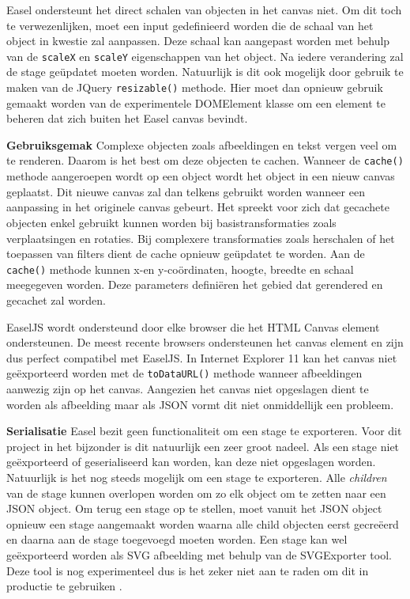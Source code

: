 Easel ondersteunt het direct schalen van objecten in het canvas niet. Om dit toch te verwezenlijken, moet een input gedefinieerd worden die de schaal van het object in kwestie zal aanpassen. Deze schaal kan aangepast worden met behulp van de \texttt{scaleX} en \texttt{scaleY} eigenschappen van het object. Na iedere verandering zal de stage ge\"{u}pdatet moeten worden. Natuurlijk is dit ook mogelijk door gebruik te maken van de JQuery \texttt{resizable()} methode. Hier moet dan opnieuw gebruik gemaakt worden van de experimentele DOMElement klasse om een element te beheren dat zich buiten het Easel canvas bevindt. 

\textbf{Gebruiksgemak} \break
Complexe objecten zoals afbeeldingen en tekst vergen veel om te renderen. Daarom is het best om deze objecten te cachen. Wanneer de \texttt{cache()} methode aangeroepen wordt op een object wordt het object in een nieuw canvas geplaatst. Dit nieuwe canvas zal dan telkens gebruikt worden wanneer een aanpassing in het originele canvas gebeurt. Het spreekt voor zich dat gecachete objecten enkel gebruikt kunnen worden bij basistransformaties zoals verplaatsingen en rotaties. Bij complexere transformaties zoals herschalen of het toepassen van filters dient de cache opnieuw ge\"{u}pdatet te worden. Aan de \texttt{cache()} methode kunnen x-en y-co\"{o}rdinaten, hoogte, breedte en schaal meegegeven worden. Deze parameters defini\"{e}ren het gebied dat gerendered en gecachet zal worden. 

EaselJS wordt ondersteund door elke browser die het HTML Canvas element ondersteunen. De meest recente browsers ondersteunen het canvas element en zijn dus perfect compatibel met EaselJS. In Internet Explorer 11 kan het canvas niet ge\"{e}xporteerd worden met de \texttt{toDataURL()} methode wanneer afbeeldingen aanwezig zijn op het canvas. Aangezien het canvas niet opgeslagen dient te worden als afbeelding maar als JSON vormt dit niet onmiddellijk een probleem.

\textbf{Serialisatie} \break
Easel bezit geen functionaliteit om een stage te exporteren. Voor dit project in het bijzonder is dit natuurlijk een zeer groot nadeel. Als een stage niet ge\"{e}xporteerd of geserialiseerd kan worden, kan deze niet opgeslagen worden. Natuurlijk is het nog steeds mogelijk om een stage te exporteren. Alle \textit{children} van de stage kunnen overlopen worden om zo elk object om te zetten naar een JSON object. Om terug een stage op te stellen, moet vanuit het JSON object opnieuw een stage aangemaakt worden waarna alle child objecten eerst gecre\"{e}erd en daarna aan de stage toegevoegd moeten worden. Een stage kan wel ge\"{e}xporteerd worden als SVG afbeelding met behulp van de SVGExporter tool.  Deze tool is nog experimenteel dus is het zeker niet aan te raden om dit in productie te gebruiken \cite{SVGExporter}. 

